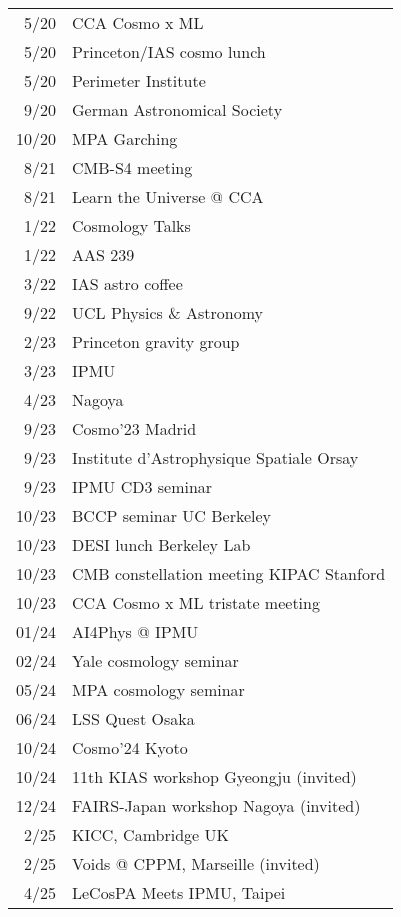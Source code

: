 \begin{tabular}{r l}
 5/20 & CCA Cosmo x ML \\
 5/20 & Princeton/IAS cosmo lunch \\
 5/20 & Perimeter Institute \\
 9/20 & German Astronomical Society \\
10/20 & MPA Garching \\
 8/21 & CMB-S4 meeting \\
 8/21 & Learn the Universe @ CCA \\
 1/22 & Cosmology Talks \\
 1/22 & AAS 239 \\
 3/22 & IAS astro coffee \\
 9/22 & UCL Physics \& Astronomy \\
 2/23 & Princeton gravity group \\
 3/23 & IPMU \\
 4/23 & Nagoya \\
 9/23 & Cosmo'23 Madrid \\
 9/23 & Institute d'Astrophysique Spatiale Orsay \\
 9/23 & IPMU CD3 seminar \\
10/23 & BCCP seminar UC Berkeley \\
10/23 & DESI lunch Berkeley Lab \\
10/23 & CMB constellation meeting KIPAC Stanford \\
10/23 & CCA Cosmo x ML tristate meeting \\
01/24 & AI4Phys @ IPMU \\
02/24 & Yale cosmology seminar \\
05/24 & MPA cosmology seminar \\
06/24 & LSS Quest Osaka \\
10/24 & Cosmo'24 Kyoto \\
10/24 & 11th KIAS workshop Gyeongju (invited) \\
12/24 & FAIRS-Japan workshop Nagoya (invited) \\
 2/25 & KICC, Cambridge UK \\
 2/25 & Voids @ CPPM, Marseille (invited) \\
 4/25 & LeCosPA Meets IPMU, Taipei \\
\end{tabular}
